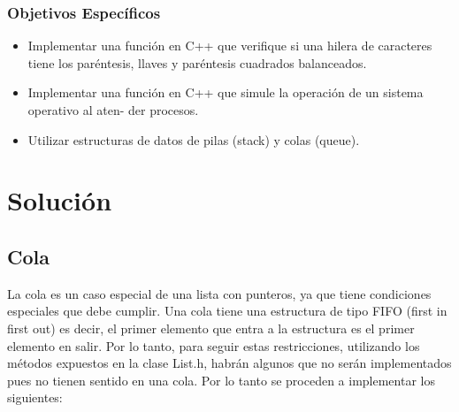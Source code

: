 \subsubsection{Objetivos Específicos}
\begin{itemize}
\item Implementar una función en C++ que verifique si una hilera de caracteres tiene los paréntesis, llaves y paréntesis cuadrados balanceados.
\item Implementar una función en C++ que simule la operación de un sistema operativo al aten-
der procesos.
\item Utilizar estructuras de datos de pilas (stack) y  colas (queue).
\end{itemize}

\newpage

 


\section{Solución}

\subsection{Cola}
La cola es un caso especial de una lista con punteros, ya que tiene condiciones especiales que debe cumplir. Una cola tiene una estructura de tipo FIFO (first in first out) es decir, el primer elemento que entra a la estructura es el primer elemento en salir. Por lo tanto, para seguir estas restricciones, utilizando los métodos expuestos en la clase List.h, habrán algunos que no serán implementados pues no tienen sentido en una cola. Por lo tanto se proceden a implementar los siguientes:

